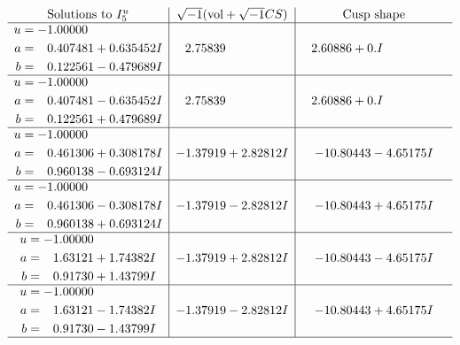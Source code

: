 \documentclass[1p]{elsarticle_modified}
\theoremstyle{definition}
\newcommand{\I}{\sqrt{-1}}
\begin{document}
$$\begin{array}{c|c|c}  
\text{Solutions to }I^u_{5}& \I (\text{vol} + \sqrt{-1}CS) & \text{Cusp shape}\\
 \hline 
\begin{aligned}
u &= -1.00000\phantom{ +0.000000I} \\
a &= \phantom{-}0.407481 + 0.635452 I \\
b &= \phantom{-}0.122561 - 0.479689 I\end{aligned}
 & \phantom{-}2.75839\phantom{ +0.000000I} & \phantom{-}2.60886 + 0. I\phantom{ +0.000000I} \\ \hline\begin{aligned}
u &= -1.00000\phantom{ +0.000000I} \\
a &= \phantom{-}0.407481 - 0.635452 I \\
b &= \phantom{-}0.122561 + 0.479689 I\end{aligned}
 & \phantom{-}2.75839\phantom{ +0.000000I} & \phantom{-}2.60886 + 0. I\phantom{ +0.000000I} \\ \hline\begin{aligned}
u &= -1.00000\phantom{ +0.000000I} \\
a &= \phantom{-}0.461306 + 0.308178 I \\
b &= \phantom{-}0.960138 - 0.693124 I\end{aligned}
 & -1.37919 + 2.82812 I & -10.80443 - 4.65175 I \\ \hline\begin{aligned}
u &= -1.00000\phantom{ +0.000000I} \\
a &= \phantom{-}0.461306 - 0.308178 I \\
b &= \phantom{-}0.960138 + 0.693124 I\end{aligned}
 & -1.37919 - 2.82812 I & -10.80443 + 4.65175 I \\ \hline\begin{aligned}
u &= -1.00000\phantom{ +0.000000I} \\
a &= \phantom{-}1.63121 + 1.74382 I \\
b &= \phantom{-}0.91730 + 1.43799 I\end{aligned}
 & -1.37919 + 2.82812 I & -10.80443 - 4.65175 I \\ \hline\begin{aligned}
u &= -1.00000\phantom{ +0.000000I} \\
a &= \phantom{-}1.63121 - 1.74382 I \\
b &= \phantom{-}0.91730 - 1.43799 I\end{aligned}
 & -1.37919 - 2.82812 I & -10.80443 + 4.65175 I\\
 \hline 
 \end{array}$$\newpage\newpage\renewcommand{\arraystretch}{1}
\end{document}
